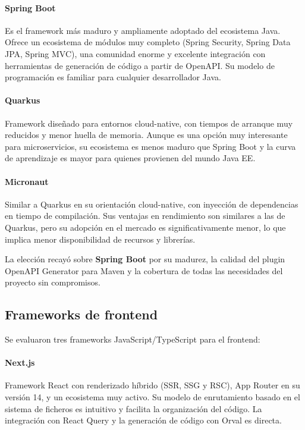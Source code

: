 \paragraph{Spring Boot~\cite{springboot}} Es el framework más maduro y ampliamente adoptado del
ecosistema Java. Ofrece un ecosistema de módulos muy completo (Spring Security,
Spring Data JPA, Spring MVC), una comunidad enorme y excelente integración con
herramientas de generación de código a partir de OpenAPI. Su modelo de
programación es familiar para cualquier desarrollador Java.

\paragraph{Quarkus} Framework diseñado para entornos cloud-native, con tiempos
de arranque muy reducidos y menor huella de memoria. Aunque es una opción muy
interesante para microservicios, su ecosistema es menos maduro que Spring Boot
y la curva de aprendizaje es mayor para quienes provienen del mundo Java EE.

\paragraph{Micronaut} Similar a Quarkus en su orientación cloud-native, con
inyección de dependencias en tiempo de compilación. Sus ventajas en rendimiento
son similares a las de Quarkus, pero su adopción en el mercado es significativamente
menor, lo que implica menor disponibilidad de recursos y librerías.

La elección recayó sobre \textbf{Spring Boot} por su madurez, la calidad del
plugin OpenAPI Generator para Maven y la cobertura de todas las necesidades
del proyecto sin compromisos.

\subsection{Frameworks de frontend}

Se evaluaron tres frameworks JavaScript/TypeScript para el frontend:

\paragraph{Next.js~\cite{nextjs}} Framework React con renderizado híbrido (SSR, SSG y RSC),
App Router en su versión 14, y un ecosistema muy activo. Su modelo de enrutamiento
basado en el sistema de ficheros es intuitivo y facilita la organización del
código. La integración con React Query y la generación de código con Orval es
directa.

